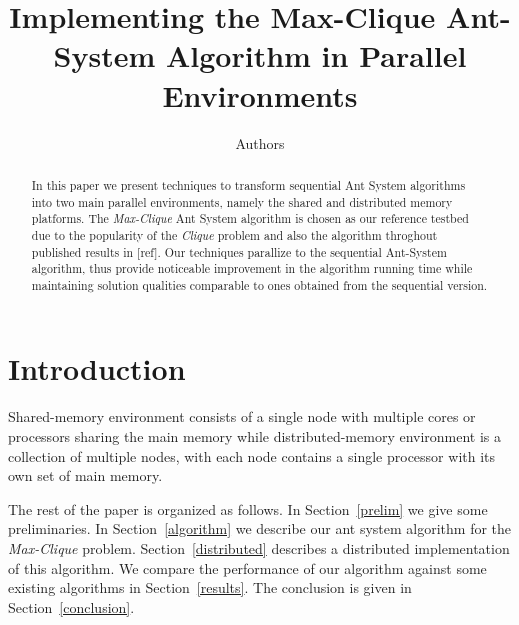 \documentclass[11pt]{article}
\begin{document}
  

\title{Implementing the Max-Clique Ant-System Algorithm in Parallel Environments} 
\author{ 
Authors\\ 
}  
\maketitle  


\begin{abstract}
In this paper we present techniques to transform sequential Ant System algorithms into two 
main parallel environments, namely the shared and distributed memory platforms.
The \textit{Max-Clique} Ant System algorithm is chosen as our reference testbed 
due to the popularity of the \textit{Clique} problem and also the algorithm 
throghout published results in [ref].%
Our techniques parallize to the sequential Ant-System algorithm, 
thus provide noticeable improvement in 
the algorithm running time while maintaining solution qualities 
comparable to ones obtained from the sequential version.
\end{abstract}


\section{Introduction}\label{intro}

Shared-memory environment consists of a single node with multiple cores or processors sharing 
the main memory 
while distributed-memory environment is a collection of multiple nodes, with each node 
contains a single processor with its own set of main memory. %

The rest of the paper is organized as follows.  In Section~\ref{prelim} we
give some preliminaries.  In Section~\ref{algorithm} we describe our ant
system algorithm for the \textit{Max-Clique} problem.  Section~\ref{distributed}
describes a distributed implementation of this algorithm.  We compare the
performance of our algorithm against some existing algorithms in
Section~\ref{results}.  The conclusion is given in Section~\ref{conclusion}.
\end{document}
